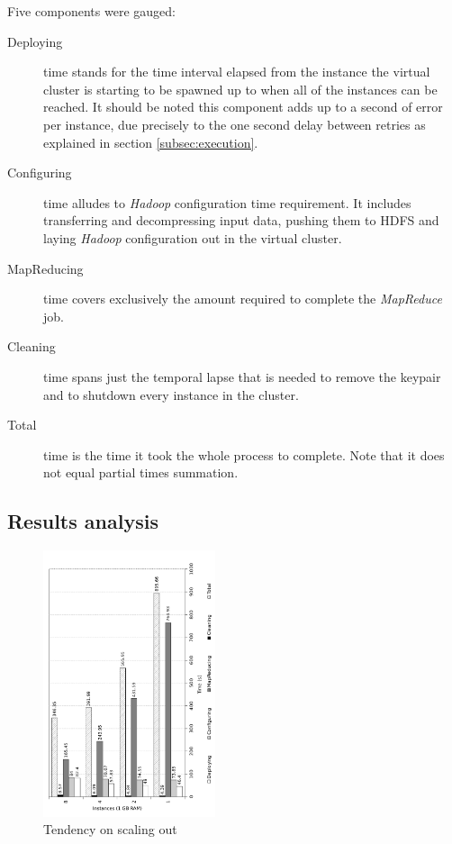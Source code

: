 \documentclass{sig-alternate}
\begin{document}
Five components were gauged:
\begin{description}
 \item[Deploying] time stands for the time interval elapsed from the instance the virtual cluster is starting to be spawned up to when all of the instances can be reached. It should be noted this component adds up to a second of error per instance, due precisely to the one second delay between retries as explained in section \ref{subsec:execution}.
 \item[Configuring] time alludes to \emph{Hadoop} configuration time requirement. It includes transferring and decompressing input data, pushing them to HDFS and laying \emph{Hadoop} configuration out in the virtual cluster.
 \item[MapReducing] time covers exclusively the amount required to complete the \emph{MapReduce} job.
 \item[Cleaning] time spans just the temporal lapse that is needed to remove the keypair and to shutdown every instance in the cluster.
 \item[Total] time is the time it took the whole process to complete. Note that it does not equal partial times summation.
\end{description}

\subsection{Results analysis}
\noindent 

\begin{figure}[htb]
\centering
\includegraphics[width=0.45\textwidth]{img/007}
\caption{Tendency on scaling out}
\label{fig:scaleout}
\end{figure}
\end{document}
